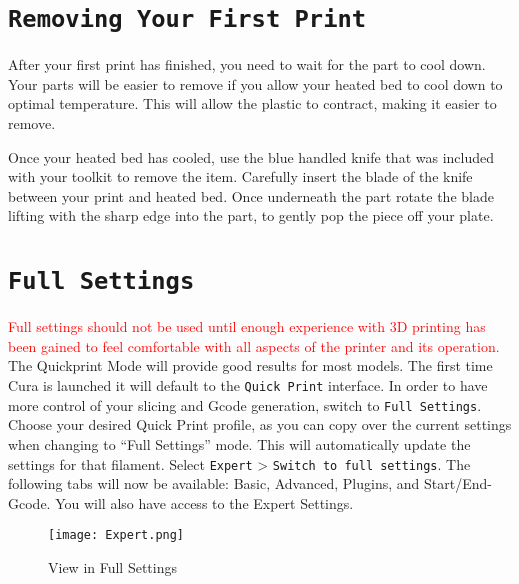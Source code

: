 

\section{\texttt{Removing Your First Print}}
After your first print has finished, you need to wait for the part to cool down.  Your parts will be easier to remove if you allow your heated bed to cool down to optimal temperature. This will allow the plastic to contract, making it easier to remove. 

Once your heated bed has cooled, use the blue handled knife that was included with your toolkit to remove the item. Carefully insert the blade of the knife between your print and heated bed. Once underneath the part rotate the blade lifting with the sharp edge into the part, to gently pop the piece off your plate.

\section{\texttt{Full Settings}}
\textcolor{red}{Full settings should not be used until enough experience with 3D printing has been gained to feel comfortable with all aspects of the printer and its operation.} The Quickprint Mode will provide good results for most models.
The first time Cura is launched it will default to the \texttt{Quick Print} interface. In order to have more control of your slicing and Gcode generation, switch to \texttt{Full Settings}. Choose your desired Quick Print profile, as you can copy over the current settings when changing to ``Full Settings'' mode. This will automatically update the settings for that filament. Select \texttt{Expert} > \texttt{Switch to full settings}. The following tabs will now be available: Basic, Advanced, Plugins, and Start/End-Gcode. You will also have access to the Expert Settings. 
\begin{figure}[H]
\centering
\texttt{[image: Expert.png]}
\caption{View in Full Settings}
\label{fig:Full Settings View}
\end{figure}


